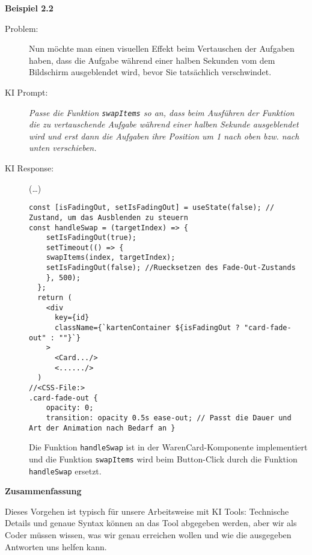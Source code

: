 \textbf{Beispiel 2.2} 
\begin{description}
    \item[Problem:] 
Nun möchte man einen visuellen Effekt beim Vertauschen der Aufgaben haben, dass die Aufgabe während einer halben Sekunden vom dem Bildschirm ausgeblendet wird, bevor Sie tatsächlich verschwindet. 
\item[KI Prompt:] \emph{Passe die Funktion \texttt{swapItems} so an, dass beim Ausführen der Funktion die zu vertauschende Aufgabe während einer halben Sekunde ausgeblendet wird und erst dann die Aufgaben ihre Position um 1 nach oben bzw. nach unten verschieben. }

\item[KI Response:] (\ldots)
\begin{lstlisting}
const [isFadingOut, setIsFadingOut] = useState(false); // Zustand, um das Ausblenden zu steuern
const handleSwap = (targetIndex) => {
    setIsFadingOut(true);
    setTimeout(() => {
    swapItems(index, targetIndex);
    setIsFadingOut(false); //Ruecksetzen des Fade-Out-Zustands
    }, 500);
  };
  return (
    <div
      key={id}
      className={`kartenContainer ${isFadingOut ? "card-fade-out" : ""}`}
    >
      <Card.../>
      <....../>
  )
//<CSS-File:>
.card-fade-out {
    opacity: 0;
    transition: opacity 0.5s ease-out; // Passt die Dauer und Art der Animation nach Bedarf an }

\end{lstlisting}

Die Funktion \texttt{handleSwap} ist in der WarenCard-Komponente implementiert und die Funktion \texttt{swapItems} wird beim Button-Click durch die Funktion \texttt{handleSwap} ersetzt.
\end{description}

\textbf{Zusammenfassung}

Dieses Vorgehen ist typisch für unsere Arbeitsweise mit KI Tools: Technische Details und genaue Syntax können an das Tool abgegeben werden, aber wir als Coder müssen wissen, was wir genau erreichen wollen und wie die ausgegeben Antworten uns helfen kann. 